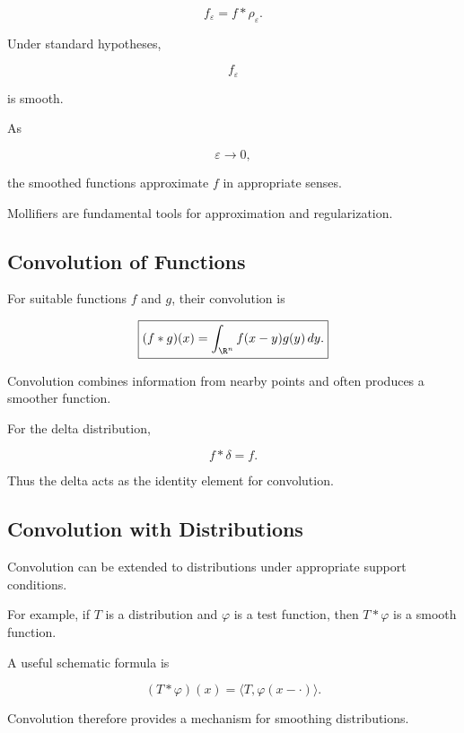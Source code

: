 \[
\boxed{
f_\varepsilon
=
f*\rho_\varepsilon.
}
\]

Under standard hypotheses,

\[
f_\varepsilon
\]

is smooth.

As

\[
\varepsilon\to0,
\]

the smoothed functions approximate \(f\) in appropriate senses.

Mollifiers are fundamental tools for approximation and regularization.

\subsection{Convolution of Functions}
\label{subsec:distribution-convolution-functions}

For suitable functions \(f\) and \(g\), their convolution is

\[
\boxed{
(f*g)(x)
=
\int_{\R^n}
f(x-y)g(y)\,dy.
}
\]

Convolution combines information from nearby points and often produces a
smoother function.

For the delta distribution,

\[
\boxed{
f*\delta=f.
}
\]

Thus the delta acts as the identity element for convolution.

\subsection{Convolution with Distributions}
\label{subsec:convolution-distributions}

Convolution can be extended to distributions under appropriate support
conditions.

For example, if \(T\) is a distribution and \(\varphi\) is a test
function, then \(T*\varphi\) is a smooth function.

A useful schematic formula is

\[
\boxed{
(T*\varphi)(x)
=
\langle
T,
\varphi(x-\cdot)
\rangle.
}
\]

Convolution therefore provides a mechanism for smoothing distributions.

